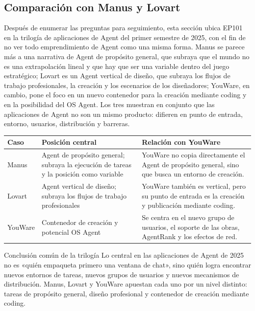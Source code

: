 \subsection{Comparación con Manus y Lovart}

Después de enumerar las preguntas para seguimiento, esta sección ubica EP101 en la trilogía de aplicaciones de Agent del primer semestre de 2025, con el fin de no ver todo emprendimiento de Agent como una misma forma. Manus se parece más a una narrativa de Agent de propósito general, que subraya que el mundo no es una extrapolación lineal y que hay que ser una variable dentro del juego estratégico; Lovart es un Agent vertical de diseño, que subraya los flujos de trabajo profesionales, la creación y los escenarios de los diseñadores; YouWare, en cambio, pone el foco en un nuevo contenedor para la creación mediante coding y en la posibilidad del OS Agent. Los tres muestran en conjunto que las aplicaciones de Agent no son un mismo producto: difieren en punto de entrada, entorno, usuarios, distribución y barreras.

\noindent\begin{tabularx}{\textwidth}{p{}p{}X}
\toprule
Caso & Posición central & Relación con YouWare \\
\midrule
Manus & Agent de propósito general; subraya la ejecución de tareas y la posición como variable & YouWare no copia directamente el Agent de propósito general, sino que busca un entorno de creación. \\
Lovart & Agent vertical de diseño; subraya los flujos de trabajo profesionales & YouWare también es vertical, pero su punto de entrada es la creación y publicación mediante coding. \\
YouWare & Contenedor de creación y potencial OS Agent & Se centra en el nuevo grupo de usuarios, el soporte de las obras, AgentRank y los efectos de red. \\
\bottomrule
\end{tabularx}

\begin{importantbox}{Conclusión común de la trilogía}
Lo central en las aplicaciones de Agent de 2025 no es «quién empaqueta primero una ventana de chat», sino quién logra encontrar nuevos entornos de tareas, nuevos grupos de usuarios y nuevos mecanismos de distribución. Manus, Lovart y YouWare apuestan cada uno por un nivel distinto: tareas de propósito general, diseño profesional y contenedor de creación mediante coding.
\end{importantbox}

